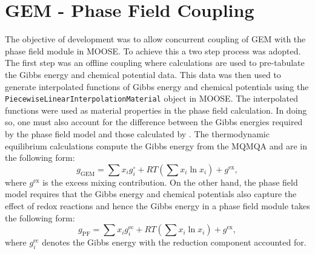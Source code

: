 \section{GEM - Phase Field Coupling}\label{sec:gem_pf}
The objective of {\YJ} development was to allow concurrent coupling of GEM with the phase field module in MOOSE. To achieve this a two step process was adopted. The first step was an offline coupling where {\GEM} calculations are used to pre-tabulate the Gibbs energy and chemical potential data. This data was then used to generate interpolated functions of Gibbs energy and chemical potentials using the \texttt{PiecewiseLinearInterpolationMaterial} object in MOOSE. The interpolated functions were used as material properties in the phase field calculation. In doing so, one must also account for the difference between the Gibbs energies required by the phase field model and those calculated by {\GEM}. The thermodynamic equilibrium calculations compute the Gibbs energy from the MQMQA and are in the following form:
\begin{equation}
	g_\text{GEM} = \sum x_i g_i^\circ + RT\left( \sum x_i \ln{x_i} \right) + g^\text{ex},
\end{equation}
where $g^\text{ex}$ is the excess mixing contribution. On the other hand, the phase field model requires that the Gibbs energy and chemical potentials also capture the effect of redox reactions and hence the Gibbs energy in a phase field module takes the following form:
\begin{equation}
	g_\text{PF} = \sum x_i g_i^\text{ec}  + RT\left( \sum x_i \ln{x_i} \right) + g^\text{ex},
\end{equation}
where $g_i^\text{ec}$ denotes the Gibbs energy with the reduction component accounted for. 

